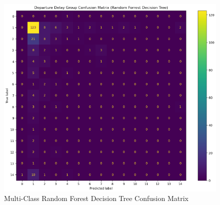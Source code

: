 \documentclass[a4paper,12pt]{article}
\begin{document}
\begin{figure}
    \centering
    \includegraphics*[scale=.50]{../../img/model_rq2_cfmtrx_4.png}
    \caption[]{Multi-Class Random Forest Decision Tree Confusion Matrix}
    \label{fig:model:rq2:cfmtrx_4}
\end{figure}
\end{document}
